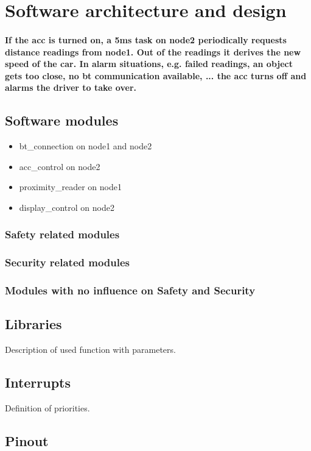 \section{Software architecture and design}
\label{chapter2}

\paragraph
{
	If the acc is turned on, a 5ms task on node2 periodically requests distance readings from node1. Out of the
	readings it derives the new speed of the car. In alarm situations, e.g. failed readings, an object gets too close,
	no bt communication available, ... the acc turns off and alarms the driver to take over.
}

\subsection{Software modules}

\begin{itemize}
	\item bt\_connection on node1 and node2
	\item acc\_control on node2
	\item proximity\_reader on node1
	\item display\_control on node2
\end{itemize}


\subsubsection{Safety related modules}


\subsubsection{Security related modules}

\subsubsection{Modules with no influence on Safety and Security}

\subsection{Libraries}

Description of used function with parameters.


\subsection{Interrupts}

Definition of priorities.


\subsection{Pinout}

